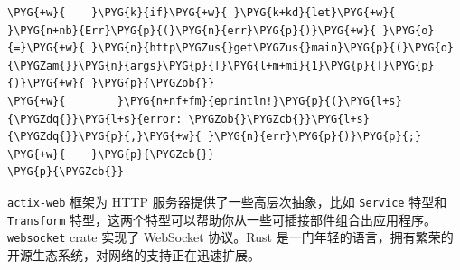 \begin{Verbatim}[commandchars=\\\{\},breaklines=true,breakanywhere=true,fontsize=\codefont,xleftmargin=17bp]
\PYG{+w}{    }\PYG{k}{if}\PYG{+w}{ }\PYG{k+kd}{let}\PYG{+w}{ }\PYG{n+nb}{Err}\PYG{p}{(}\PYG{n}{err}\PYG{p}{)}\PYG{+w}{ }\PYG{o}{=}\PYG{+w}{ }\PYG{n}{http\PYGZus{}get\PYGZus{}main}\PYG{p}{(}\PYG{o}{\PYGZam{}}\PYG{n}{args}\PYG{p}{[}\PYG{l+m+mi}{1}\PYG{p}{]}\PYG{p}{)}\PYG{+w}{ }\PYG{p}{\PYGZob{}}
\PYG{+w}{        }\PYG{n+nf+fm}{eprintln!}\PYG{p}{(}\PYG{l+s}{\PYGZdq{}}\PYG{l+s}{error: \PYGZob{}\PYGZcb{}}\PYG{l+s}{\PYGZdq{}}\PYG{p}{,}\PYG{+w}{ }\PYG{n}{err}\PYG{p}{)}\PYG{p}{;}
\PYG{+w}{    }\PYG{p}{\PYGZcb{}}
\PYG{p}{\PYGZcb{}}
\end{Verbatim}

\texttt{actix-web} 框架为 HTTP 服务器提供了一些高层次抽象，比如 \texttt{Service} 特型和 \texttt{Transform} 特型，这两个特型可以帮助你从一些可插接部件组合出应用程序。\texttt{websocket} crate 实现了 WebSocket 协议。Rust 是一门年轻的语言，拥有繁荣的开源生态系统，对网络的支持正在迅速扩展。

